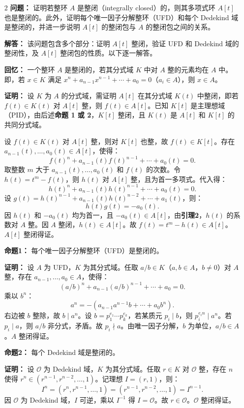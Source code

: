\documentclass[UTF8]{ctexart}
\begin{document}
\begin{enumerate}
\item[2] \textbf{问题：} 证明若整环 \(A\) 是整闭（integrally closed）的，则其多项式环 \(A[t]\) 也是整闭的。此外，证明每个唯一因子分解整环（UFD）和每个 Dedekind 域是整闭的，并进一步说明 \(A[t]\) 的整闭包与 \(A\) 的整闭包之间的关系。

\textbf{解答：} 该问题包含多个部分：证明 \(A[t]\) 整闭，验证 UFD 和 Dedekind 域的整闭性，及 \(A[t]\) 整闭包的性质。以下逐一解答。

\textbf{回忆：} 一个整环 \(A\) 是整闭的，若其分式域 \(K\) 中对 \(A\) 整的元素均在 \(A\) 中。即，若 \(x \in K\) 满足 \(x^n + a_{n-1} x^{n-1} + \cdots + a_0 = 0\)（\(a_i \in A\)），则 \(x \in A\)。

\textbf{证明：} 设 \(K\) 为 \(A\) 的分式域，需证明 \(A[t]\) 在其分式域 \(K(t)\) 中整闭，即若 \(f(t) \in K(t)\) 对 \(A[t]\) 整，则 \(f(t) \in A[t]\)。已知 \(K[t]\) 是主理想域（PID），由后述\textbf{命题 1 或 2}，\(K[t]\) 整闭，且 \(K(t)\) 是 \(A[t]\) 和 \(K[t]\) 的共同分式域。

设 \(f(t) \in K(t)\) 对 \(A[t]\) 整，则对 \(K[t]\) 也整，故 \(f(t) \in K[t]\)。存在 \(a_{n-1}(t), \dots, a_0(t) \in A[t]\)，使得：
\[
f(t)^n + a_{n-1}(t) f(t)^{n-1} + \cdots + a_0(t) = 0.
\]
取整数 \(m\) 大于 \(a_{n-1}(t), \dots, a_0(t)\) 和 \(f(t)\) 的次数。令 \(h(t) = t^m - f(t)\)，则 \(h(t)\) 对 \(A[t]\) 整，且为首一多项式。代入得：
\[
h(t)^n + a_{n-1}(t) h(t)^{n-1} + \cdots + a_0(t) = 0.
\]
设 \(g(t) = h(t)^{n-1} + a_{n-1}(t) h(t)^{n-2} + \cdots + a_1(t)\)，则：
\[
h(t) g(t) = -a_0(t).
\]
因 \(h(t)\) 和 \(-a_0(t)\) 均为首一，且 \(-a_0(t) \in A[t]\)，由\textbf{引理2}，\(h(t)\) 的系数对 \(A\) 整。因 \(A\) 整闭，\(h(t) \in A[t]\)。故 \(f(t) = t^m - h(t) \in A[t]\)。\(A[t]\) 整闭得证。

\textbf{命题1：} 每个唯一因子分解整环（UFD）是整闭的。

\textbf{证明：} 设 \(A\) 为 UFD，\(K\) 为其分式域。任取 \(a/b \in K\)（\(a, b \in A\)，\(b \neq 0\)）对 \(A\) 整，存在 \(a_{n-1}, \dots, a_0 \in A\)，使得：
\[
(a/b)^n + a_{n-1} (a/b)^{n-1} + \cdots + a_0 = 0.
\]
乘以 \(b^n\)：
\[
a^n = - (a_{n-1} a^{n-1} b + \cdots + a_0 b^n).
\]
右边被 \(b\) 整除，故 \(b \mid a^n\)。设 \(b = p_1^{e_1} \cdots p_k^{e_k}\)，若某质元 \(p_i \mid b\)，则 \(p_i^{e_i n} \mid a^n\)。若 \(p_i \mid a\)，则 \(a/b\) 非分式，矛盾。故 \(p_i \nmid a\)。由唯一因子分解，\(b\) 为单位，\(a/b \in A\)。\(A\) 整闭得证。

\textbf{命题2：} 每个 Dedekind 域是整闭的。

\textbf{证明：} 设 \(\mathcal{O}\) 为 Dedekind 域，\(K\) 为其分式域。任取 \(r \in K\) 对 \(\mathcal{O}\) 整，存在 \(n\) 使得 \(r^n \in (r^{n-1}, r^{n-2}, \dots, 1)\)。记理想 \(I = (r, 1)\)，则：
\[
I^n = (r^n, r^{n-1}, \dots, 1) = (r^{n-1}, r^{n-2}, \dots, 1) = I^{n-1}.
\]
因 \(\mathcal{O}\) 为 Dedekind 域，\(I\) 可逆，乘以 \(I^{-1}\) 得 \(I = \mathcal{O}\)。故 \(r \in \mathcal{O}\)。\(\mathcal{O}\) 整闭得证。


\end{enumerate}
\end{document}
